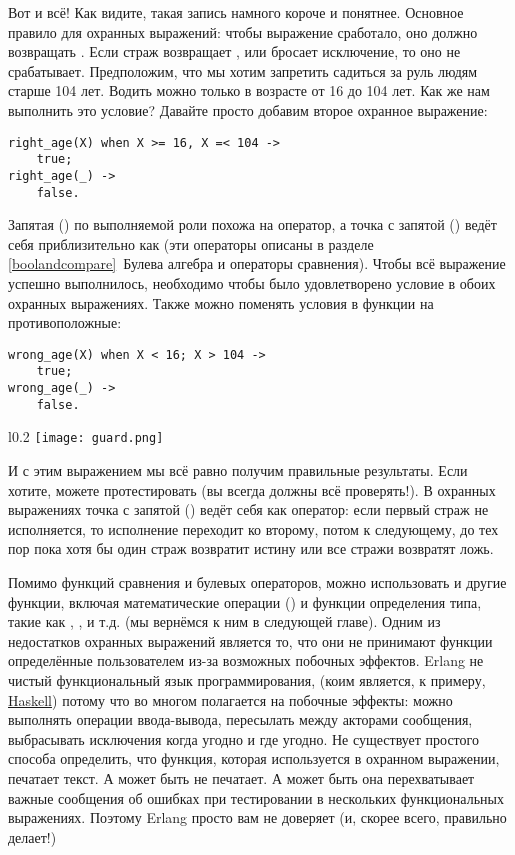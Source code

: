 Вот и всё!
Как видите, такая запись намного короче и понятнее.
Основное правило для охранных выражений: чтобы выражение сработало, оно должно возвращать .
Если страж возвращает , или бросает исключение, то оно не срабатывает.
Предположим, что мы хотим запретить садиться за руль людям старше 104 лет.
Водить можно только в возрасте от 16 до 104 лет. Как же нам выполнить это условие?
Давайте просто добавим второе охранное выражение:
\begin{lstlisting}[style=erlang]
right_age(X) when X >= 16, X =< 104 ->
    true;
right_age(_) ->
    false.
\end{lstlisting}

Запятая (\ops{\strut,}) по выполняемой роли похожа на оператор, а точка с запятой (\ops{;}) ведёт себя приблизительно как (эти операторы описаны в разделе \ref{boolandcompare}~Булева алгебра и операторы сравнения).
Чтобы всё выражение успешно выполнилось, необходимо чтобы было удовлетворено условие в обоих охранных выражениях.
Также можно поменять условия в функции на противоположные:
\begin{lstlisting}[style=erlang]
wrong_age(X) when X < 16; X > 104 ->
    true;
wrong_age(_) ->
    false.
\end{lstlisting}
\begin{wrapfigure}{l}{0.2\linewidth}
    \texttt{[image: guard.png]}
\end{wrapfigure}

И с этим выражением мы всё равно получим правильные результаты.
Если хотите, можете протестировать (вы всегда должны всё проверять!).
В охранных выражениях точка с запятой (\ops{;}) ведёт себя как оператор: если первый страж не исполняется, то исполнение переходит ко второму, потом к следующему, до тех пор пока хотя бы один страж возвратит истину или все стражи возвратят ложь.

Помимо функций сравнения и булевых операторов, можно использовать и другие функции, включая математические операции () и функции определения типа, такие как , , и т.д. (мы вернёмся к ним в следующей главе).
Одним из недостатков охранных выражений является то, что они не принимают функции определённые пользователем из\--за возможных побочных эффектов.
Erlang не чистый функциональный язык программирования, (коим является, к примеру, \href{http://learnyouahaskell.com}{Haskell}) потому что во многом полагается на побочные эффекты: можно выполнять операции ввода\--вывода, пересылать между акторами сообщения, выбрасывать исключения когда угодно и где угодно.
Не существует простого способа определить, что функция, которая используется в охранном выражении, печатает текст.
А может быть не печатает.
А может быть она перехватывает важные сообщения об ошибках при тестировании в нескольких функциональных выражениях.
Поэтому Erlang просто вам не доверяет (и, скорее всего, правильно делает!)


